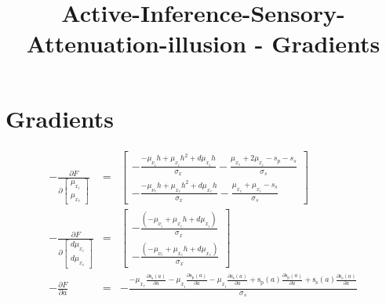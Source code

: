 \documentclass[11pt]{article}
\title{Active-Inference-Sensory-Attenuation-illusion - Gradients}
\begin{document}
\maketitle

\section*{Gradients}

$$
\begin{array}{lll}
  - \frac{\partial F}{\partial \left[\begin{matrix}\mu_{x_i}
  \\\mu_{x_e}\end{matrix} \right]} &=& \left[\begin{matrix}- \frac{-
  \mu_{\nu_i} h +  \mu_{x_i} h^{2} + d\mu_{x_i} h}{\sigma_x} - \frac{
  \mu_{x_e} + 2 \mu_{x_i} -  s_{p} - s_{s}}{\sigma_s}\\ - \frac{- \mu_{\nu_e}
  h +  \mu_{x_e} h^{2} + d\mu_{x_e} h}{\sigma_x} - \frac{ \mu_{x_e} +
  \mu_{x_i} -  s_{s}}{\sigma_s} \end{matrix}\right] \\
  - \frac{\partial F}{\partial \left[\begin{matrix}d\mu_{x_i}
  \\d\mu_{x_e}\end{matrix}\right]} &=& \left[\begin{matrix}- \frac{ \left(-
  \mu_{\nu_i} + \mu_{x_i} h + d\mu_{x_i}\right)} {\sigma_x}\\- \frac{ \left(-
  \mu_{\nu_e} + \mu_{x_e} h + d\mu_{x_e}\right)}{\sigma_x} \end{matrix}
  \right] \\
- \frac{\partial F}{\partial a} &=& - \frac{- \mu_{x_e} \frac{\partial
\operatorname{s_{s}}{\left(a \right)}}{\partial a} - \mu_{x_i} \frac{\partial
\operatorname{s_{p}}{\left(a \right)}}{\partial a} - \mu_{x_i} \frac{\partial
\operatorname{s_{s}}{\left(a \right)}}{\partial a} +
\operatorname{s_{p}}{\left(a \right)} \frac{\partial
\operatorname{s_{p}}{\left(a \right)}}{\partial a} +
\operatorname{s_{s}}{\left(a \right)} \frac{\partial
\operatorname{s_{s}}{\left(a \right)}}{\partial a}}{\sigma_s}
\end{array}
$$
\end{document}
